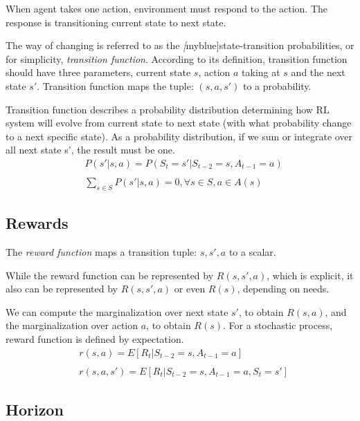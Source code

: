     When agent takes one action, environment must respond to the action. The response is transitioning current state to next
    state. \par The way of changing is referred to as the \emph[myblue]{state-transition probabilities}, or for simplicity,
    \emph{transition function}. According to its definition, transition function should have three parameters, current state
    $s$, action $a$ taking at $s$ and the next state $s'$. Transition function maps the tuple: $(s, a, s')$ to a
    probability. \par Transition function describes a probability distribution determining how RL system will evolve from
    current state to next state (with what probability change to a next specific state). As a probability distribution, if
    we sum or integrate over all next state s', the result must be one.
    \begin{align*}
       & P(s'|s,a) = P(S_{t}=s'|S_{t-2}=s, A_{t-1}=a)                  \\
      \\
       & \sum\limits_{s\in S} P(s'|s,a) = 0, \forall s\in S, a\in A(s)
    \end{align*}

  \subsection{Rewards}

    The \emph{reward function} maps a transition tuple: $s, s', a$ to a scalar.\par While the reward function can be
    represented by $R(s, s', a)$, which is explicit, it also can be represented by $R(s, s', a)$ or even $R(s)$, depending
    on needs. \par We can compute the marginalization over next state $s'$, to obtain $R(s, a)$, and the marginalization
    over action $a$, to obtain $R(s)$. For a stochastic process, reward function is defined by expectation.
    \begin{align*}
       & r(s,a)=E[R_t|S_{t-2}=s, A_{t-1}=a]            \\
      \\
       & r(s,a,s')=E[R_t|S_{t-2}=s, A_{t-1}=a, S_t=s']
    \end{align*}

  \subsection{Horizon}

